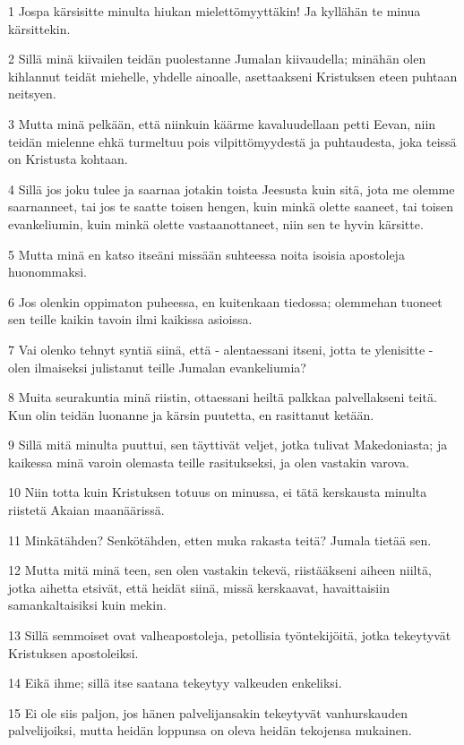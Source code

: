 \par 1 Jospa kärsisitte minulta hiukan mielettömyyttäkin! Ja kyllähän te minua kärsittekin.
\par 2 Sillä minä kiivailen teidän puolestanne Jumalan kiivaudella; minähän olen kihlannut teidät miehelle, yhdelle ainoalle, asettaakseni Kristuksen eteen puhtaan neitsyen.
\par 3 Mutta minä pelkään, että niinkuin käärme kavaluudellaan petti Eevan, niin teidän mielenne ehkä turmeltuu pois vilpittömyydestä ja puhtaudesta, joka teissä on Kristusta kohtaan.
\par 4 Sillä jos joku tulee ja saarnaa jotakin toista Jeesusta kuin sitä, jota me olemme saarnanneet, tai jos te saatte toisen hengen, kuin minkä olette saaneet, tai toisen evankeliumin, kuin minkä olette vastaanottaneet, niin sen te hyvin kärsitte.
\par 5 Mutta minä en katso itseäni missään suhteessa noita isoisia apostoleja huonommaksi.
\par 6 Jos olenkin oppimaton puheessa, en kuitenkaan tiedossa; olemmehan tuoneet sen teille kaikin tavoin ilmi kaikissa asioissa.
\par 7 Vai olenko tehnyt syntiä siinä, että - alentaessani itseni, jotta te ylenisitte - olen ilmaiseksi julistanut teille Jumalan evankeliumia?
\par 8 Muita seurakuntia minä riistin, ottaessani heiltä palkkaa palvellakseni teitä. Kun olin teidän luonanne ja kärsin puutetta, en rasittanut ketään.
\par 9 Sillä mitä minulta puuttui, sen täyttivät veljet, jotka tulivat Makedoniasta; ja kaikessa minä varoin olemasta teille rasitukseksi, ja olen vastakin varova.
\par 10 Niin totta kuin Kristuksen totuus on minussa, ei tätä kerskausta minulta riistetä Akaian maanäärissä.
\par 11 Minkätähden? Senkötähden, etten muka rakasta teitä? Jumala tietää sen.
\par 12 Mutta mitä minä teen, sen olen vastakin tekevä, riistääkseni aiheen niiltä, jotka aihetta etsivät, että heidät siinä, missä kerskaavat, havaittaisiin samankaltaisiksi kuin mekin.
\par 13 Sillä semmoiset ovat valheapostoleja, petollisia työntekijöitä, jotka tekeytyvät Kristuksen apostoleiksi.
\par 14 Eikä ihme; sillä itse saatana tekeytyy valkeuden enkeliksi.
\par 15 Ei ole siis paljon, jos hänen palvelijansakin tekeytyvät vanhurskauden palvelijoiksi, mutta heidän loppunsa on oleva heidän tekojensa mukainen.
